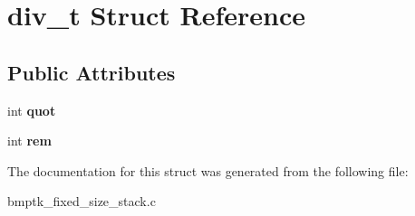 \hypertarget{structdiv__t}{}\section{div\+\_\+t Struct Reference}
\label{structdiv__t}
\subsection*{Public Attributes}
\begin{DoxyCompactItemize}
\item 
int {\bfseries quot}\hypertarget{structdiv__t_a0b9dda2884048daa68ca4aaa12b17b9a}{}\label{structdiv__t_a0b9dda2884048daa68ca4aaa12b17b9a}

\item 
int {\bfseries rem}\hypertarget{structdiv__t_ac64389de252de53eda8b4f8dbb7c623f}{}\label{structdiv__t_ac64389de252de53eda8b4f8dbb7c623f}

\end{DoxyCompactItemize}


The documentation for this struct was generated from the following file\+:\begin{DoxyCompactItemize}
\item 
bmptk\+\_\+fixed\+\_\+size\+\_\+stack.\+c\end{DoxyCompactItemize}
